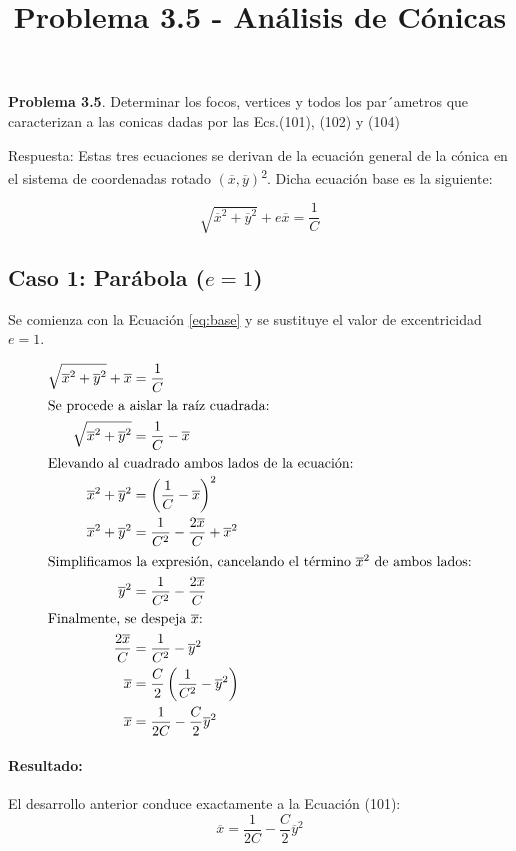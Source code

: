 \documentclass[12pt, a4paper]{article}
\title{Problema 3.5 - Análisis de Cónicas}
\date{}
\newcommand{\xbar}{\overline{x}}
\newcommand{\ybar}{\overline{y}}
\begin{document}
\maketitle


\textbf{Problema 3.5}.
Determinar los focos, vertices y todos los par´ametros que caracterizan a las conicas dadas por las Ecs.(101), (102) y (104)

Respuesta:
Estas tres ecuaciones se derivan de la ecuación general de la cónica en el sistema de coordenadas rotado $(\xbar, \ybar)$\textsuperscript{2}. Dicha ecuación base es la siguiente:

\begin{equation}
    \sqrt{\xbar^{2}+\ybar^{2}}+e\xbar=\frac{1}{C} 
    \label{eq:base}
\end{equation}


\subsection{Caso 1: Parábola ($e=1$)}

Se comienza con la Ecuación \eqref{eq:base} y se sustituye el valor de excentricidad $e=1$.

\begin{align}
    \sqrt{\xbar^{2}+\ybar^{2}}+\xbar &= \frac{1}{C} \\
    \intertext{Se procede a aislar la raíz cuadrada:}
    \sqrt{\xbar^{2}+\ybar^{2}} &= \frac{1}{C}-\xbar \\
    \intertext{Elevando al cuadrado ambos lados de la ecuación:}
    \xbar^{2}+\ybar^{2} &= \left(\frac{1}{C}-\xbar\right)^{2} \\
    \xbar^{2}+\ybar^{2} &= \frac{1}{C^{2}} - \frac{2\xbar}{C} + \xbar^{2} \\
    \intertext{Simplificamos la expresión, cancelando el término $\xbar^{2}$ de ambos lados:}
    \ybar^{2} &= \frac{1}{C^{2}} - \frac{2\xbar}{C} \\
    \intertext{Finalmente, se despeja $\xbar$:}
    \frac{2\xbar}{C} &= \frac{1}{C^{2}} - \ybar^{2} \\
    \xbar &= \frac{C}{2} \left(\frac{1}{C^{2}} - \ybar^{2}\right) \\
    \xbar &= \frac{1}{2C} - \frac{C}{2}\ybar^{2}
\end{align}

\paragraph{Resultado:} El desarrollo anterior conduce exactamente a la Ecuación (101):
\begin{equation}
    \xbar = \frac{1}{2C} - \frac{C}{2}\ybar^{2}
    \label{eq:101}
\end{equation}
\end{document}
